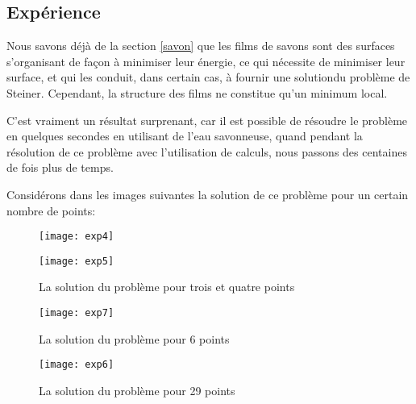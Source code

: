 \documentclass[10pt,a4paper]{article}%
\theoremstyle{theorem}
\theoremstyle{definition}
\begin{document}
         		\subsection{Expérience}
         		
         		Nous savons déjà de la section \ref{savon} que les films de savons sont des surfaces s’organisant de façon à minimiser leur énergie, ce qui nécessite de minimiser leur surface,	et qui les conduit, dans certain cas, à fournir une solutiondu problème de Steiner. Cependant, la structure des films ne
         		constitue qu’un minimum local.
         		
         		C'est vraiment un résultat surprenant, car il est possible de résoudre le problème en quelques secondes en utilisant de l'eau savonneuse, quand pendant la résolution de ce problème avec l'utilisation de calculs, nous passons des centaines de fois plus de temps.
         		
         		Considérons dans les images suivantes la solution de ce problème pour un certain nombre de points:
         		
         		\begin{figure}[h]
         			\begin{minipage}[h]{0.49\linewidth}
         				\begin{center}
         					\texttt{[image: exp4]}
         				\end{center}
         			\end{minipage}
         			\hfill
         			\begin{minipage}[h]{0.49\linewidth}
         				\begin{center}
         					\texttt{[image: exp5]}
         				\end{center}
         			\end{minipage}
         			\caption{La solution du problème pour trois et quatre points}\label{ris3.figure}
         		\end{figure}
         		
         		\begin{figure}[h]
         			\begin{center}
         				\texttt{[image: exp7]}
         			\end{center}
         		\caption{La solution du problème pour 6 points}\label{ris4.figure}
         		\end{figure}
         	
         		\begin{figure}[h]
         			\begin{center}
         				\texttt{[image: exp6]}
         			\end{center}
         		\caption{La solution du problème pour 29 points}\label{ris5.figure}
         		\end{figure}
         		
\end{document}

